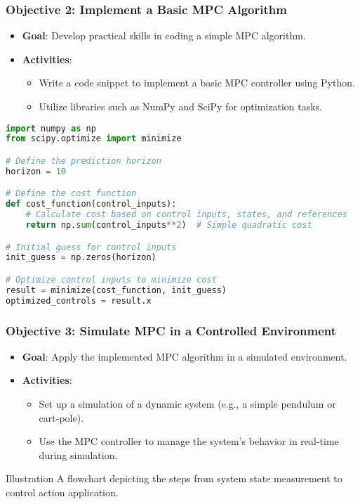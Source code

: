 \documentclass[aspectratio=169]{beamer}
\begin{document}
\begin{frame}[fragile]
    \frametitle{Objective 2: Implement a Basic MPC Algorithm}
    \begin{itemize}
        \item \textbf{Goal}: Develop practical skills in coding a simple MPC algorithm.
        \item \textbf{Activities}:
        \begin{itemize}
            \item Write a code snippet to implement a basic MPC controller using Python.
            \item Utilize libraries such as NumPy and SciPy for optimization tasks.
        \end{itemize}
    \end{itemize}
    \begin{lstlisting}[language=Python]
import numpy as np
from scipy.optimize import minimize

# Define the prediction horizon
horizon = 10

# Define the cost function
def cost_function(control_inputs):
    # Calculate cost based on control inputs, states, and references
    return np.sum(control_inputs**2)  # Simple quadratic cost

# Initial guess for control inputs
init_guess = np.zeros(horizon)

# Optimize control inputs to minimize cost
result = minimize(cost_function, init_guess)
optimized_controls = result.x
    \end{lstlisting}
\end{frame}

\begin{frame}[fragile]
    \frametitle{Objective 3: Simulate MPC in a Controlled Environment}
    \begin{itemize}
        \item \textbf{Goal}: Apply the implemented MPC algorithm in a simulated environment.
        \item \textbf{Activities}:
        \begin{itemize}
            \item Set up a simulation of a dynamic system (e.g., a simple pendulum or cart-pole).
            \item Use the MPC controller to manage the system’s behavior in real-time during simulation.
        \end{itemize}
    \end{itemize}
    \begin{block}{Illustration}
        A flowchart depicting the steps from system state measurement to control action application.
    \end{block}
\end{frame}
\end{document}
